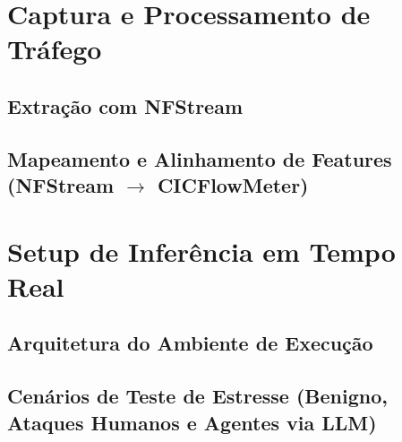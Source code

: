 \section{Captura e Processamento de Tráfego}
\label{sec:captura_processamento}

\subsection{Extração com NFStream}
\label{subsec:extracao_nfstream}

\subsection{Mapeamento e Alinhamento de Features (NFStream \texorpdfstring{$\to$}{->} CICFlowMeter)}
\label{subsec:mapeamento_features}

\section{Setup de Inferência em Tempo Real}
\label{sec:setup_inferencia}

\subsection{Arquitetura do Ambiente de Execução}
\label{subsec:arquitetura_execucao}

\subsection{Cenários de Teste de Estresse (Benigno, Ataques Humanos e Agentes via LLM)}
\label{subsec:cenarios_estresse}
